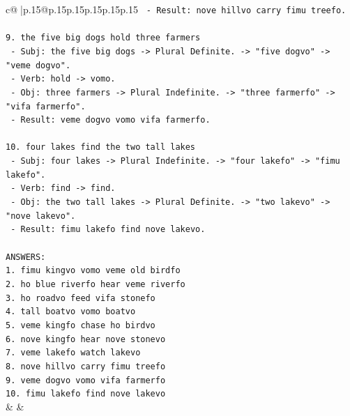 \documentclass{article}
\begin{document}
{\begin{supertabular}{c@{$\;$}|p{.15\linewidth}@{}p{.15\linewidth}p{.15\linewidth}p{.15\linewidth}p{.15\linewidth}p{.15\linewidth}}
{{{\texttt{   {-} Result: nove hillvo carry fimu treefo.} \\
\\ 
\texttt{9. the five big dogs hold three farmers} \\
\texttt{   {-} Subj: the five big dogs {-}> Plural Definite. {-}> "five dogvo" {-}> "veme dogvo".} \\
\texttt{   {-} Verb: hold {-}> vomo.} \\
\texttt{   {-} Obj: three farmers {-}> Plural Indefinite. {-}> "three farmerfo" {-}> "vifa farmerfo".} \\
\texttt{   {-} Result: veme dogvo vomo vifa farmerfo.} \\
\\ 
\texttt{10. four lakes find the two tall lakes} \\
\texttt{    {-} Subj: four lakes {-}> Plural Indefinite. {-}> "four lakefo" {-}> "fimu lakefo".} \\
\texttt{    {-} Verb: find {-}> find.} \\
\texttt{    {-} Obj: the two tall lakes {-}> Plural Definite. {-}> "two lakevo" {-}> "nove lakevo".} \\
\texttt{    {-} Result: fimu lakefo find nove lakevo.} \\
\\ 
\texttt{ANSWERS:} \\
\texttt{1. fimu kingvo vomo veme old birdfo} \\
\texttt{2. ho blue riverfo hear veme riverfo} \\
\texttt{3. ho roadvo feed vifa stonefo} \\
\texttt{4. tall boatvo vomo boatvo} \\
\texttt{5. veme kingfo chase ho birdvo} \\
\texttt{6. nove kingfo hear nove stonevo} \\
\texttt{7. veme lakefo watch lakevo} \\
\texttt{8. nove hillvo carry fimu treefo} \\
\texttt{9. veme dogvo vomo vifa farmerfo} \\
\texttt{10. fimu lakefo find nove lakevo} \\
            }
        }
    }
    & & \\ \\


\end{supertabular}}
\end{document}
